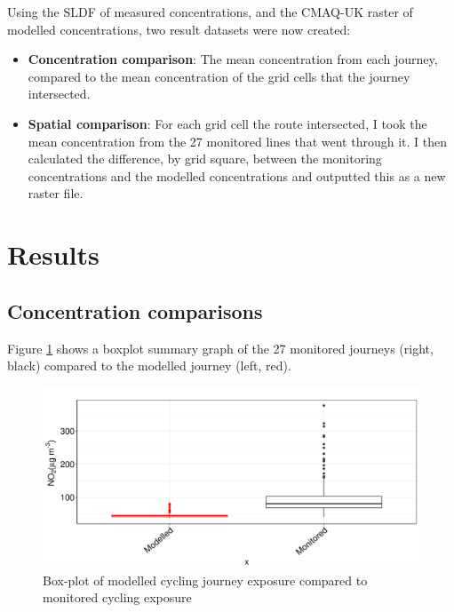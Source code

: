 Using the SLDF of measured concentrations, and the CMAQ-UK raster of modelled concentrations, two result datasets were now created:
\begin{itemize}
    \item \textbf{Concentration comparison}: The mean concentration from each journey, compared to the mean concentration of the grid cells that the journey intersected.
    \item \textbf{Spatial comparison}: For each grid cell the route intersected, I took the mean concentration from the 27 monitored lines that went through it. I then calculated the difference, by grid square, between the monitoring concentrations and the modelled concentrations and outputted this as a new raster file.
\end{itemize}

\section{Results}
\label{sec:4results}

\subsection{Concentration comparisons}
\label{subsec:concentrationcomparisons}

Figure \ref{fig:grouped_journey_boxplots} shows a boxplot summary graph of the 27 monitored journeys (right, black) compared to the modelled journey (left, red).

\begin{figure}[H]
\centering
\includegraphics[scale=0.5]{images/grouped_journey_boxplots.png}
\caption{Box-plot of modelled cycling journey exposure compared to monitored cycling exposure}
\label{fig:grouped_journey_boxplots}
\end{figure}

